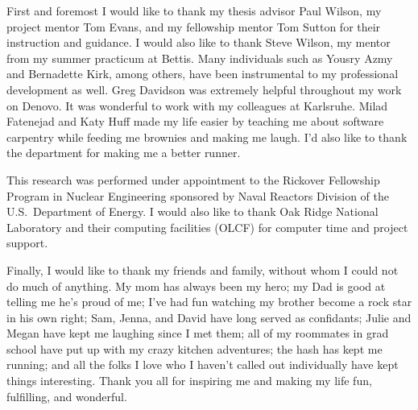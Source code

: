 \begin{acknowledgments}
First and foremost I would like to thank my thesis advisor Paul Wilson, my project mentor Tom Evans, and my fellowship mentor Tom Sutton for their instruction and guidance. I would also like to thank Steve Wilson, my mentor from my summer practicum at Bettis. Many individuals such as Yousry Azmy and Bernadette Kirk, among others, have been instrumental to my professional development as well. Greg Davidson was extremely helpful throughout my work on Denovo. It was wonderful to work with my colleagues at Karlsruhe. Milad Fatenejad and Katy Huff made my life easier by teaching me about software carpentry while feeding me brownies and making me laugh. I'd also like to thank the department for making me a better runner. 

This research was performed under appointment to the Rickover Fellowship Program in Nuclear Engineering sponsored by Naval Reactors Division of the U.S.\ Department of Energy. I would also like to thank Oak Ridge National Laboratory and their computing facilities (OLCF) for computer time and project support. 

Finally, I would like to thank my friends and family, without whom I could not do much of anything. My mom has always been my hero; my Dad is good at telling me he's proud of me; I've had fun watching my brother become a rock star in his own right;  Sam, Jenna, and David have long served as confidants; Julie and Megan have kept me laughing since I met them; all of my roommates in grad school have put up with my crazy kitchen adventures; the hash has kept me running; and all the folks I love who I haven't called out individually have kept things interesting. Thank you all for inspiring me and making my life fun, fulfilling, and wonderful.

\end{acknowledgments}

\tableofcontents
\listoftables
\listoffigures


